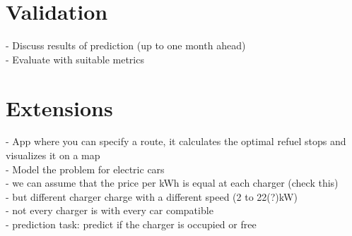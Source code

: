 \documentclass[%
a4paper,
DIV12,
2.5headlines,
bigheadings,
titlepage,
openbib,
]{scrartcl}
\begin{document}
\section{Validation}\label{validation}
- Discuss results of prediction (up to one month ahead)\\
- Evaluate with suitable metrics


\section{Extensions}\label{extensions}
- App where you can specify a route, it calculates the optimal refuel stops and visualizes it on a map\\ 
- Model the problem for electric cars\\
 - we can assume that the price per kWh is equal at each charger (check this)\\
 - but different charger charge with a different speed (2 to 22(?)kW)\\
 - not every charger is with every car compatible\\
 - prediction task: predict if the charger is occupied or free\\


 
\end{document}
